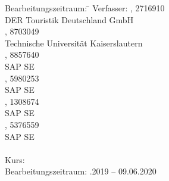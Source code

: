\begin{titlepage}
\begin{center}
\begin{minipage}{\textwidth}
		\begin{tabbing}
			Bearbeitungszeitraum: \hspace{0.85cm}\=\kill
			Verfasser: \> \authorSG, 2716910 \\
			\> DER Touristik Deutschland GmbH \\[3mm]
			\> \authorRF, 8703049 \\
			\> Technische Universität Kaiserslautern \\[3mm]
			\> \authorMS, 8857640 \\
			\> SAP SE \\[3mm]
			\> \authorEJ, 5980253 \\
			\> SAP SE \\[3mm]
			\> \authorNL, 1308674 \\
			\> SAP SE \\[3mm]
			\> \authorJR, 5376559 \\
			\> SAP SE \\
			\> \\[1.5mm]
			Kurs: \> \DieKursbezeichnung \\[1.5mm]
			Bearbeitungszeitraum: .2019 -- 09.06.2020
	\end{tabbing}

	\end{minipage}

\end{center}

\end{titlepage}